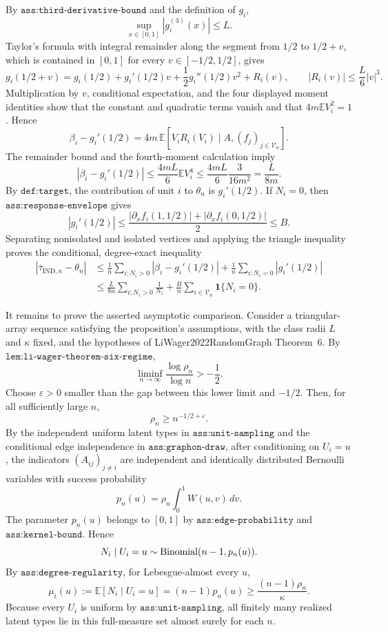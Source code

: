By \(\texttt{ass:third-derivative-bound}\) and the definition of \(g_i\),
\[
\sup_{x\in[0,1]}|g_i^{(3)}(x)|\le L.
\]
Taylor's formula with integral remainder along the segment from \(1/2\) to \(1/2+v\), which is contained in \([0,1]\) for every \(v\in[-1/2,1/2]\), gives
\[
g_i(1/2+v)
=g_i(1/2)+g_i'(1/2)v+\frac12g_i''(1/2)v^2+R_i(v),
\qquad
|R_i(v)|\le\frac L6|v|^3.
\]
Multiplication by \(v\), conditional expectation, and the four displayed moment identities show that the constant and quadratic terms vanish and that \(4m\mathbb E V_i^2=1\).  Hence
\[
\beta_i-g_i'(1/2)
=4m\,\mathbb E\!\left[V_iR_i(V_i)\mid A,(f_j)_{j\in\mathcal V_n}\right].
\]
The remainder bound and the fourth-moment calculation imply
\[
|\beta_i-g_i'(1/2)|
\le \frac{4mL}{6}\mathbb E V_i^4
\le \frac{4mL}{6}\frac3{16m^2}
=\frac{L}{8m}.
\]
By \(\texttt{def:target}\), the contribution of unit \(i\) to \(\theta_n\) is \(g_i'(1/2)\).  If \(N_i=0\), then \(\texttt{ass:response-envelope}\) gives
\[
|g_i'(1/2)|
\le\frac{|\partial_x f_i(1,1/2)|+|\partial_x f_i(0,1/2)|}{2}
\le B.
\]
Separating nonisolated and isolated vertices and applying the triangle inequality proves the conditional, degree-exact inequality
\[
\begin{aligned}
|\bar\tau_{\mathrm{IND},n}-\theta_n|
&\le \frac1n\sum_{i:N_i>0}|\beta_i-g_i'(1/2)|
+\frac1n\sum_{i:N_i=0}|g_i'(1/2)|\\
&\le \frac{L}{8n}\sum_{i:N_i>0}\frac1{N_i}
+\frac Bn\sum_{i\in\mathcal V_n}\mathbf1\{N_i=0\}.
\end{aligned}
\]

It remains to prove the asserted asymptotic comparison.  Consider a triangular-array sequence satisfying the proposition's assumptions, with the class radii \(L\) and \(\kappa\) fixed, and the hypotheses of LiWager2022RandomGraph Theorem~6.  By \(\texttt{lem:li-wager-theorem-six-regime}\),
\[
\liminf_{n\to\infty}\frac{\log\rho_n}{\log n}>-\frac12.
\]
Choose \(\varepsilon>0\) smaller than the gap between this lower limit and \(-1/2\).  Then, for all sufficiently large \(n\),
\[
\rho_n\ge n^{-1/2+\varepsilon}.
\]
By the independent uniform latent types in \(\texttt{ass:unit-sampling}\) and the conditional edge independence in \(\texttt{ass:graphon-draw}\), after conditioning on \(U_i=u\), the indicators \((A_{ij})_{j\ne i}\) are independent and identically distributed Bernoulli variables with success probability
\[
p_n(u)=\rho_n\int_0^1W(u,v)\,dv.
\]
The parameter \(p_n(u)\) belongs to \([0,1]\) by \(\texttt{ass:edge-probability}\) and \(\texttt{ass:kernel-bound}\).  Hence
\[
N_i\mid U_i=u\sim {\rm Binomial}(n-1,p_n(u)).
\]
By \(\texttt{ass:degree-regularity}\), for Lebesgue-almost every \(u\),
\[
\mu_i(u):=\mathbb E[N_i\mid U_i=u]
=(n-1)p_n(u)
\ge\frac{(n-1)\rho_n}{\kappa}.
\]
Because every \(U_i\) is uniform by \(\texttt{ass:unit-sampling}\), all finitely many realized latent types lie in this full-measure set almost surely for each \(n\).

